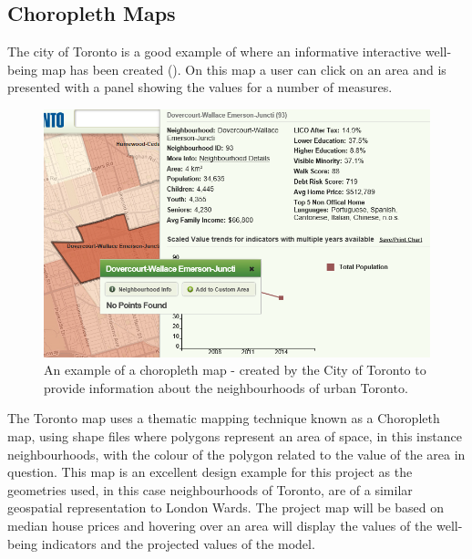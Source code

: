 
\subsection{Choropleth Maps}
The city of Toronto is a good example of where an informative interactive well-being map has been created (\cite{toronto_2018}). On this map a user can click on an area and is presented with a panel showing the values for a number of measures.

\begin{figure}[H]
\centering
\includegraphics[scale=0.5]{figures/toronto_choropleth}
\decoRule
\caption{An example of a choropleth map - created by the City of Toronto to provide information about the neighbourhoods of urban Toronto.}
\end{figure}

The Toronto map uses a thematic mapping technique known as a Choropleth map, using shape files where polygons represent an area of space, in this instance neighbourhoods, with the colour of the polygon related to the value of the area in question.
This map is an excellent design example for this project as the geometries used, in this case neighbourhoods of Toronto, are of a similar geospatial representation to London Wards. The project map will be based on median house prices and hovering over an area will display the values of the well-being indicators and the projected values of the model.


